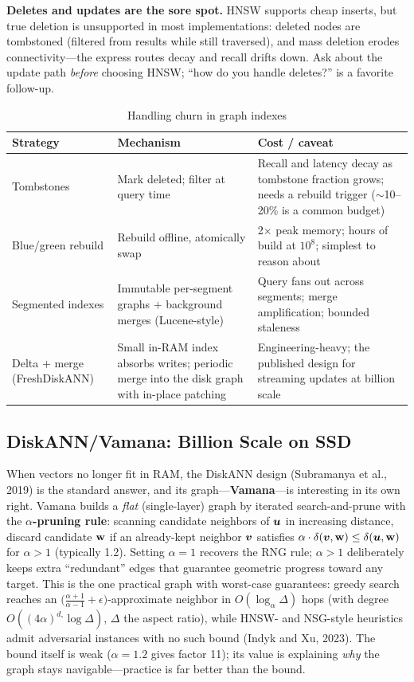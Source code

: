 \textbf{Deletes and updates are the sore spot.} HNSW supports cheap inserts, but true deletion is unsupported in most implementations: deleted nodes are tombstoned (filtered from results while still traversed), and mass deletion erodes connectivity---the express routes decay and recall drifts down. Ask about the update path \emph{before} choosing HNSW; ``how do you handle deletes?'' is a favorite follow-up.

\begin{table}[H]
\centering
\caption{Handling churn in graph indexes}
\label{sr:tab:graph_updates}
\begin{tabularx}{\textwidth}{lXX}
\toprule
\textbf{Strategy} & \textbf{Mechanism} & \textbf{Cost / caveat} \\
\midrule
Tombstones & Mark deleted; filter at query time & Recall and latency decay as tombstone fraction grows; needs a rebuild trigger ($\sim$10--20\% is a common budget) \\
Blue/green rebuild & Rebuild offline, atomically swap & 2$\times$ peak memory; hours of build at $10^8$; simplest to reason about \\
Segmented indexes & Immutable per-segment graphs $+$ background merges (Lucene-style) & Query fans out across segments; merge amplification; bounded staleness \\
Delta $+$ merge (FreshDiskANN) & Small in-RAM index absorbs writes; periodic merge into the disk graph with in-place patching & Engineering-heavy; the published design for streaming updates at billion scale \\
\bottomrule
\end{tabularx}
\end{table}

\subsection{DiskANN/Vamana: Billion Scale on SSD}

When vectors no longer fit in RAM, the DiskANN design (Subramanya et al., 2019) is the standard answer, and its graph---\textbf{Vamana}---is interesting in its own right. Vamana builds a \emph{flat} (single-layer) graph by iterated search-and-prune with the \textbf{$\alpha$-pruning rule}: scanning candidate neighbors of $\bm{u}$ in increasing distance, discard candidate $\mathbf{w}$ if an already-kept neighbor $\bm{v}$ satisfies $\alpha \cdot \delta(\bm{v}, \mathbf{w}) \le \delta(\bm{u}, \mathbf{w})$ for $\alpha > 1$ (typically 1.2). Setting $\alpha = 1$ recovers the RNG rule; $\alpha > 1$ deliberately keeps extra ``redundant'' edges that guarantee geometric progress toward any target. This is the one practical graph with worst-case guarantees: greedy search reaches an $\big(\frac{\alpha+1}{\alpha-1} + \epsilon\big)$-approximate neighbor in $O(\log_{\alpha} \Delta)$ hops (with degree $O((4\alpha)^{d_\circ} \log \Delta)$, $\Delta$ the aspect ratio), while HNSW- and NSG-style heuristics admit adversarial instances with no such bound (Indyk and Xu, 2023). The bound itself is weak ($\alpha = 1.2$ gives factor 11); its value is explaining \emph{why} the graph stays navigable---practice is far better than the bound.

